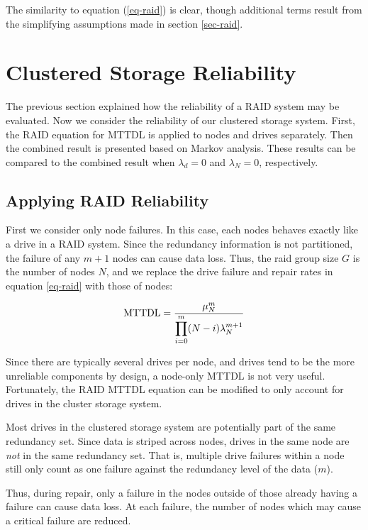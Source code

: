 \documentclass[11pt]{article}
\newcommand{\mttdl}{{\rm MTTDL}}
\numberwithin{equation}{section}
\begin{document}
The similarity to equation (\ref{eq-raid}) is clear, though additional
terms result from the simplifying assumptions made in section \ref{sec-raid}.

\section{Clustered Storage Reliability}
\label{sec-cluster}

The previous section explained how the reliability of a RAID system may be
evaluated.  Now we consider the reliability of our clustered storage system.
First, the RAID equation for MTTDL is applied to nodes and drives separately.
Then the combined result is presented based on Markov analysis.  These
results can be compared to the combined result when $\lambda_{d}=0$ and
$\lambda_{N}=0$, respectively.

\subsection{Applying RAID Reliability}

First we consider only node failures.  In this case, each nodes behaves
exactly like a drive in a RAID system.  Since the redundancy information is
not partitioned, the failure of any $m+1$ nodes can cause data loss.  Thus,
the raid group size $G$ is the number of nodes $N$, and we replace the drive
failure and repair rates in equation \ref{eq-raid} with those of nodes: 

\begin{equation}
\mttdl = \frac{\mu_{N}^{m}}{\displaystyle \prod_{i=0}^{m}(N -
i)\lambda_{N}^{m+1}}
\label{eq-raid-nodes}
\end{equation}

Since there are typically several drives per node, and drives tend to be the
more unreliable components by design, a node-only MTTDL is not very useful.
Fortunately, the RAID MTTDL equation can be modified to only account for 
drives in the cluster storage system.

Most drives in the clustered storage system are potentially part of the same
redundancy set.  Since data is striped across nodes, drives in the same node
are {\em not} in the same redundancy set.  That is, multiple drive failures
within a node still only count as one failure against the redundancy level of
the data ($m$).

Thus, during repair, only a failure in the nodes outside of those already
having a failure can cause data loss.  At each failure, the number of nodes
which may cause a critical failure are reduced.
\end{document}
